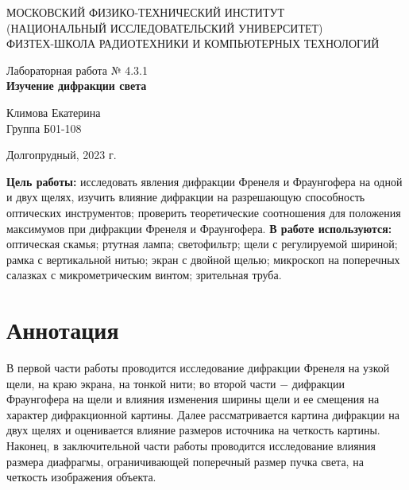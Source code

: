 \documentclass[a4paper,12pt]{article} %
\begin{document}
\begin{center}
	\footnotesize{МОСКОВСКИЙ ФИЗИКО-ТЕХНИЧЕСКИЙ ИНСТИТУТ\\(НАЦИОНАЛЬНЫЙ 			ИССЛЕДОВАТЕЛЬСКИЙ УНИВЕРСИТЕТ)}\\
	\footnotesize{ФИЗТЕХ-ШКОЛА РАДИОТЕХНИКИ И КОМПЬЮТЕРНЫХ ТЕХНОЛОГИЙ\\}
	\hfill \break
	\hfill \break
	\hfill \break
	\hfill \break
	\hfill \break
	\hfill \break
\end{center}

\begin{center}   
    \hfill \break
	\hfill \break
	\hfill \break
	\hfill \break
	\hfill \break
	\hfill \break
	\hfill \break
	\hfill \break
	\hfill \break
	\hfill \break
	\hfill \break
	\large{Лабораторная работа № 4.3.1\\\large{\textbf{Изучение дифракции света}}}\\
	\hfill \break
        \hfill \break
	\hfill \break
	\hfill \break
	\hfill \break
	\hfill \break
	\hfill \break
	\hfill \break
	\hfill \break
	\hfill \break
	\hfill \break
	\begin{flushright}
		Климова Екатерина\\
		Группа Б01-108
	\end{flushright}
	\hfill \break
\end{center}
\hfill \break
\hfill \break
\begin{center}
	Долгопрудный, 2023 г.
\end{center}
\thispagestyle{empty}

\newpage
\hfill \break
\textbf{Цель работы:} исследовать явления дифракции Френеля и Фраунгофера на одной и двух щелях, изучить влияние дифракции на разрешающую способность оптических инструментов; проверить теоретические соотношения для положения максимумов при дифракции Френеля и Фраунгофера. 
\hfill \break
\hfill \break
\textbf{В работе используются:} оптическая скамья; ртутная лампа; светофильтр; щели с регулируемой шириной; рамка с вертикальной нитью; экран с двойной щелью; микроскоп на поперечных салазках с микрометрическим винтом; зрительная труба.

\section{Аннотация}
\hfill \break В первой части работы проводится исследование дифракции Френеля на узкой щели, на краю экрана, на тонкой нити; во второй части $ - $ дифракции Фраунгофера на щели и влияния изменения ширины щели и ее смещения на характер дифракционной картины. Далее рассматривается картина дифракции на двух щелях и оценивается влияние размеров источника на четкость картины. Наконец, в заключительной части работы проводится исследование влияния размера диафрагмы, ограничивающей поперечный размер пучка света, на четкость изображения объекта.
\end{document}
